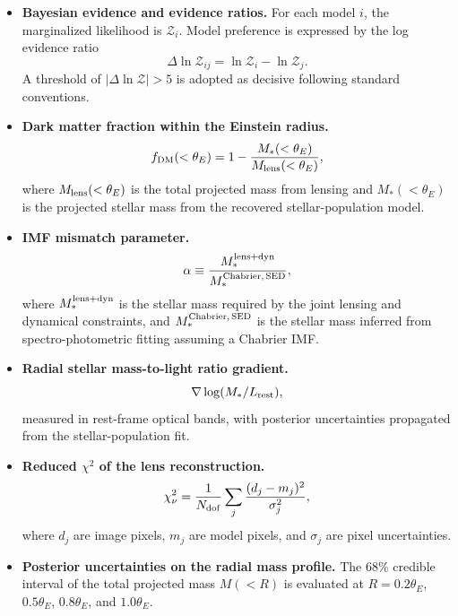 \documentclass{article}
\begin{document}
\begin{itemize}
    \item \textbf{Bayesian evidence and evidence ratios.} For each model $i$, the marginalized likelihood is $\mathcal{Z}_i$. Model preference is expressed by the log evidence ratio
    \begin{equation}
    \Delta \ln \mathcal{Z}_{ij} = \ln \mathcal{Z}_i - \ln \mathcal{Z}_j .
    \end{equation}
    A threshold of $|\Delta \ln \mathcal{Z}|>5$ is adopted as decisive following standard conventions.
    \item \textbf{Dark matter fraction within the Einstein radius.}
    \begin{equation}
    f_{\rm DM}(<\theta_E) = 1 - \frac{M_*(<\theta_E)}{M_{\rm lens}(<\theta_E)} ,
    \end{equation}
    where $M_{\rm lens}(<\theta_E)$ is the total projected mass from lensing and $M_*(<\theta_E)$ is the projected stellar mass from the recovered stellar-population model.
    \item \textbf{IMF mismatch parameter.}
    \begin{equation}
    \alpha \equiv \frac{M_*^{\rm lens+dyn}}{M_*^{\rm Chabrier,\,SED}} ,
    \end{equation}
    where $M_*^{\rm lens+dyn}$ is the stellar mass required by the joint lensing and dynamical constraints, and $M_*^{\rm Chabrier,\,SED}$ is the stellar mass inferred from spectro-photometric fitting assuming a Chabrier IMF.
    \item \textbf{Radial stellar mass-to-light ratio gradient.}
    \begin{equation}
    \nabla \log (M_*/L_{\rm rest}) ,
    \end{equation}
    measured in rest-frame optical bands, with posterior uncertainties propagated from the stellar-population fit.
    \item \textbf{Reduced $\chi^2$ of the lens reconstruction.}
    \begin{equation}
    \chi^2_\nu = \frac{1}{N_{\rm dof}}\sum_j \frac{(d_j - m_j)^2}{\sigma_j^2} ,
    \end{equation}
    where $d_j$ are image pixels, $m_j$ are model pixels, and $\sigma_j$ are pixel uncertainties.
    \item \textbf{Posterior uncertainties on the radial mass profile.} The 68\% credible interval of the total projected mass $M(<R)$ is evaluated at $R=0.2\theta_E$, $0.5\theta_E$, $0.8\theta_E$, and $1.0\theta_E$.
\end{itemize}
\end{document}
